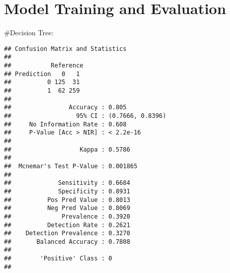 \documentclass[
]{article}
\newenvironment{Shaded}{\begin{snugshade}}{\end{snugshade}}
\newcommand{\AttributeTok}[1]{\textcolor[rgb]{0.13,0.29,0.53}{#1}}
\newcommand{\CommentTok}[1]{\textcolor[rgb]{0.56,0.35,0.01}{\textit{#1}}}
\newcommand{\FloatTok}[1]{\textcolor[rgb]{0.00,0.00,0.81}{#1}}
\newcommand{\FunctionTok}[1]{\textcolor[rgb]{0.13,0.29,0.53}{\textbf{#1}}}
\newcommand{\NormalTok}[1]{#1}
\newcommand{\OtherTok}[1]{\textcolor[rgb]{0.56,0.35,0.01}{#1}}
\newcommand{\SpecialCharTok}[1]{\textcolor[rgb]{0.81,0.36,0.00}{\textbf{#1}}}
\newcommand{\StringTok}[1]{\textcolor[rgb]{0.31,0.60,0.02}{#1}}
\begin{document}
\section{Model Training and
Evaluation}\label{model-training-and-evaluation}

\#Decision Tree:

\begin{Shaded}
\end{Shaded}

\begin{verbatim}
## Confusion Matrix and Statistics
## 
##           Reference
## Prediction   0   1
##          0 125  31
##          1  62 259
##                                           
##                Accuracy : 0.805           
##                  95% CI : (0.7666, 0.8396)
##     No Information Rate : 0.608           
##     P-Value [Acc > NIR] : < 2.2e-16       
##                                           
##                   Kappa : 0.5786          
##                                           
##  Mcnemar's Test P-Value : 0.001865        
##                                           
##             Sensitivity : 0.6684          
##             Specificity : 0.8931          
##          Pos Pred Value : 0.8013          
##          Neg Pred Value : 0.8069          
##              Prevalence : 0.3920          
##          Detection Rate : 0.2621          
##    Detection Prevalence : 0.3270          
##       Balanced Accuracy : 0.7808          
##                                           
##        'Positive' Class : 0               
## 
\end{verbatim}
\end{document}

